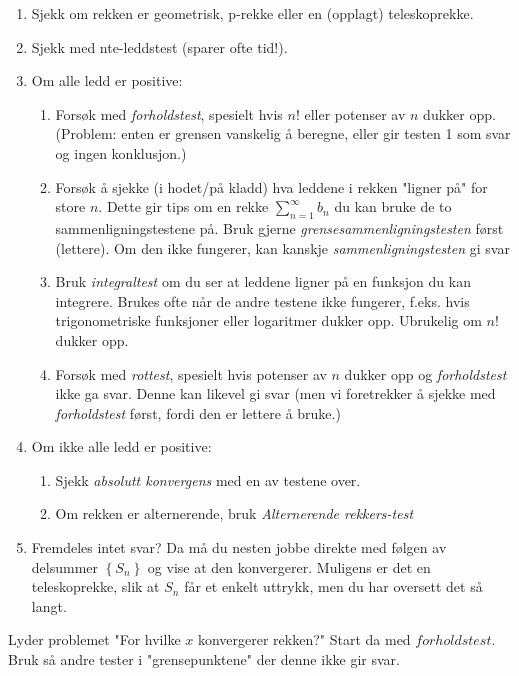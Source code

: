 \documentclass[11pt]{article}
\theoremstyle{definition}
\theoremstyle{definition}
\theoremstyle{definition}
\theoremstyle{definition}
\theoremstyle{definition}
\theoremstyle{definition}
\begin{document}
		
		\begin{enumerate}
			\item Sjekk om rekken er geometrisk, p-rekke eller en (opplagt) teleskoprekke.
			\item Sjekk med nte-leddstest (sparer ofte tid!).
			\item Om alle ledd er positive:
			\begin{enumerate}
				\item Forsøk med \textit{forholdstest}, spesielt hvis \(n!\) eller potenser av \(n\) dukker opp. (Problem: enten er grensen vanskelig å beregne, eller gir testen 1 som svar og ingen konklusjon.)
				\item Forsøk å sjekke (i hodet/på kladd) hva leddene i rekken "ligner på" for store \(n\). Dette gir tips om en rekke \(\sum_{n=1}^{\infty}b_n\) du kan bruke de to sammenligningstestene på. Bruk gjerne \textit{grensesammenligningstesten} først (lettere). Om den ikke fungerer, kan kanskje \textit{sammenligningstesten} gi svar
				\item Bruk \textit{integraltest} om du ser at leddene ligner på en funksjon du kan integrere. Brukes ofte når de andre testene ikke fungerer, f.eks. hvis trigonometriske funksjoner eller logaritmer dukker opp. Ubrukelig om \(n!\) dukker opp.
				\item Forsøk med \textit{rottest}, spesielt hvis potenser av \(n\) dukker opp og \textit{forholdstest} ikke ga svar. Denne kan likevel gi svar (men vi foretrekker å sjekke med \textit{forholdstest} først, fordi den er lettere å bruke.)
			\end{enumerate}
			\item Om ikke alle ledd er positive:
			\begin{enumerate}
				\item Sjekk \textit{absolutt konvergens} med en av testene over.
				\item Om rekken er alternerende, bruk \textit{Alternerende rekkers-test}
				
			\end{enumerate}
			\item Fremdeles intet svar? Da må du nesten jobbe direkte med følgen av delsummer \(\left\lbrace S_n\right\rbrace \) og vise at den konvergerer. Muligens er det en teleskoprekke, slik at \(S_n\) får et enkelt uttrykk, men du har oversett det så langt.
		\end{enumerate}
		
		Lyder problemet "For hvilke \(x\) konvergerer rekken?" Start da med \(forholdstest\). Bruk så andre tester i "grensepunktene" der denne ikke gir svar.
		
\end{document}

